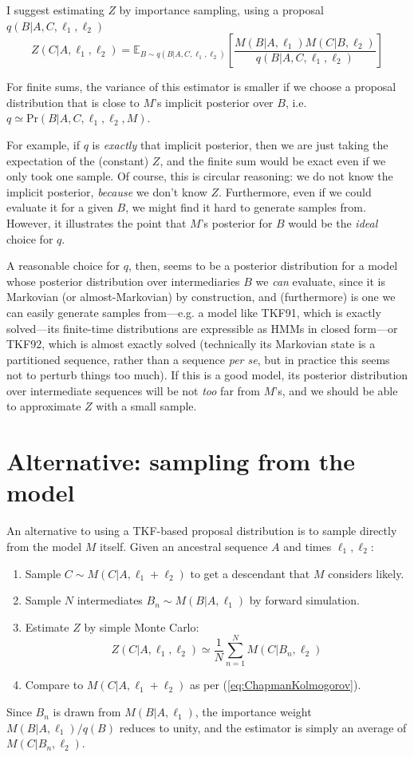 \documentclass{article}
\newcommand\prob[1]{\mbox{Pr}\left( #1 \right)}
\newcommand\expect{\mathbb{E}}
\newcommand\eqnlabel[1]{\label{eq:#1}}
\newcommand\eqnref[1]{(\ref{eq:#1})}
\newcommand\seclabel[1]{\label{sec:#1}}
\begin{document}
I suggest estimating $Z$ by importance sampling, using a proposal $q(B|A,C,\ell_1,\ell_2)$
\[
Z(C|A,\ell_1,\ell_2) = \expect_{B \sim q(B|A,C,\ell_1,\ell_2)} \left[ \frac{M(B|A,\ell_1) M(C|B,\ell_2)}{q(B|A,C,\ell_1,\ell_2)} \right]
\]

For finite sums, the variance of this estimator is smaller if we choose a proposal distribution that is
close to $M$'s implicit posterior over $B$, i.e. $q \simeq \prob{B|A,C,\ell_1,\ell_2,M}$.

For example, if $q$ is {\em exactly} that implicit posterior, then we are just taking the expectation of the (constant) $Z$, and the finite sum would be exact even if we only took one sample.
Of course, this is circular reasoning:
we do not know the implicit posterior, {\em because} we don't know $Z$.
Furthermore, even if we could evaluate it for a given $B$, we might find it hard to generate samples from.
However, it illustrates the point that $M$'s posterior for $B$ would be the {\em ideal} choice for $q$.

A reasonable choice for $q$, then, seems to be a posterior distribution for a model whose posterior distribution over intermediaries $B$ we {\em can} evaluate, since it is Markovian (or almost-Markovian) by construction, and (furthermore) is one we can easily generate samples from---e.g. a model like TKF91,
which is exactly solved---its finite-time distributions are expressible as HMMs in closed form---or TKF92,
which is almost exactly solved (technically its Markovian state is a partitioned sequence,
rather than a sequence {\em per se}, but in practice this seems not to perturb things too much).
If this is a good model, its posterior distribution over intermediate sequences will be not {\em too} far
from $M$'s, and we should be able to approximate $Z$ with a small sample.

\section{Alternative: sampling from the model}
\seclabel{ModelSampling}

An alternative to using a TKF-based proposal distribution is to
sample directly from the model $M$ itself.
Given an ancestral sequence $A$ and times $\ell_1,\ell_2$:
\begin{enumerate}
\item Sample $C \sim M(C|A,\ell_1+\ell_2)$ to get a descendant that $M$ considers likely.
\item Sample $N$ intermediates $B_n \sim M(B|A,\ell_1)$ by forward simulation.
\item Estimate $Z$ by simple Monte Carlo:
\begin{equation}
Z(C|A,\ell_1,\ell_2) \simeq \frac{1}{N} \sum_{n=1}^{N} M(C|B_n,\ell_2)
\eqnlabel{ModelMonteCarlo}
\end{equation}
\item Compare to $M(C|A,\ell_1+\ell_2)$ as per \eqnref{ChapmanKolmogorov}.
\end{enumerate}
Since $B_n$ is drawn from $M(B|A,\ell_1)$, the importance weight
$M(B|A,\ell_1)/q(B)$ reduces to unity, and the estimator is simply an average of $M(C|B_n,\ell_2)$.
\end{document}
